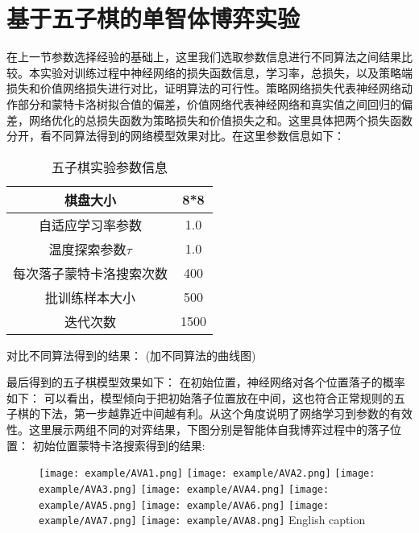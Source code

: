\section{基于五子棋的单智体博弈实验}

在上一节参数选择经验的基础上，这里我们选取参数信息进行不同算法之间结果比较。本实验对训练过程中神经网络的损失函数信息，学习率，总损失，以及策略端损失和价值网络损失进行对比，证明算法的可行性。策略网络损失代表神经网络动作部分和蒙特卡洛树拟合值的偏差，价值网络代表神经网络和真实值之间回归的偏差，网络优化的总损失函数为策略损失和价值损失之和。这里具体把两个损失函数分开，看不同算法得到的网络模型效果对比。在这里参数信息如下：
\begin{table}
	\centering
	\caption{五子棋实验参数信息}
	\begin{tabular}{c|c}
		\hline 
		棋盘大小 & 8*8 \\ 
		\hline 
		自适应学习率参数 & 1.0 \\ 
		\hline 
		温度探索参数$\tau$& 1.0 \\ 
		\hline 
		每次落子蒙特卡洛搜索次数 & 400 \\ 
		\hline 
		批训练样本大小 & 500 \\ 
		\hline 
		迭代次数 & 1500 \\ 
		\hline 
	\end{tabular} 
\end{table}


对比不同算法得到的结果：
(加不同算法的曲线图)

最后得到的五子棋模型效果如下：
在初始位置，神经网络对各个位置落子的概率如下：
可以看出，模型倾向于把初始落子位置放在中间，这也符合正常规则的五子棋的下法，第一步越靠近中间越有利。从这个角度说明了网络学习到参数的有效性。这里展示两组不同的对弈结果，下图分别是智能体自我博弈过程中的落子位置：
初始位置蒙特卡洛搜索得到的结果:

\begin{figure}[!htpb]
	\centering
	\texttt{[image: example/AVA1.png]}
	\hspace{0.5cm}
	\texttt{[image: example/AVA2.png]}
	\hspace{0.5cm}
	\texttt{[image: example/AVA3.png]}
	\hspace{0.5cm}
	\texttt{[image: example/AVA4.png]}
	\hspace{0.5cm}
	\texttt{[image: example/AVA5.png]}
	\hspace{0.5cm}
	\texttt{[image: example/AVA6.png]}
	\hspace{0.5cm}
	\texttt{[image: example/AVA7.png]}
	\hspace{0.5cm}
	\texttt{[image: example/AVA8.png]}
	{English caption}
	\label{fig:AIvsAI}
\end{figure}

